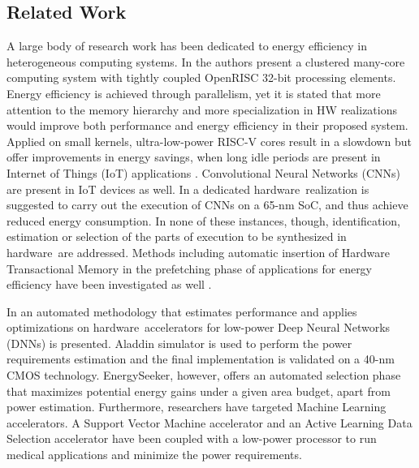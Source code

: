 \documentclass[]{usiinfthesis}
\newcommand{\eseeker}{{EnergySeeker}}
\newcommand{\HW}{{hardware}}
\begin{document}
\subsection{Related Work}

A large body of research work has been dedicated to energy efficiency in heterogeneous computing
systems. In \cite{ContiSep16} \cite{MelpignanoJune12} the authors present a clustered many-core 
computing system with tightly coupled OpenRISC 32-bit processing elements. Energy efficiency is 
achieved through parallelism, yet it is stated that more attention to the memory hierarchy and 
more specialization in HW realizations would improve both performance and energy efficiency in 
their proposed system. Applied on small kernels, ultra-low-power RISC-V cores result in a slowdown 
but offer improvements in energy savings, when long idle periods are present in Internet of 
Things (IoT) applications \cite{SchiavoneSep17}. Convolutional Neural Networks (CNNs) are 
present in IoT devices as well. In \cite{PulliniJan17} a dedicated \HW\ realization is 
suggested to carry out the execution of CNNs on a 65-nm SoC, and thus achieve reduced energy
consumption. In none of these instances, though, identification, estimation or selection of
the parts of execution to be synthesized in \HW\ are addressed. Methods including automatic
insertion of Hardware Transactional Memory in the prefetching phase of applications for
energy efficiency have been investigated as well \cite{ZacharopoulosMay15}.\par

In \cite{ReagenJun16} an automated methodology that estimates performance and 
applies optimizations on \HW\ accelerators for low-power Deep Neural Networks (DNNs) is presented. 
Aladdin simulator \cite{ShaoJul14} is used to perform the power requirements estimation and the 
final implementation is validated on a 40-nm CMOS technology. \eseeker, however, offers
an automated selection phase that maximizes potential energy gains under a 
given area budget, apart from power estimation.
Furthermore, researchers have targeted 
Machine Learning accelerators. A Support Vector Machine accelerator and an Active Learning Data Selection 
accelerator have been coupled with a low-power processor \cite{LeeApr13} to run medical
applications and minimize the power requirements.\par
\end{document}
